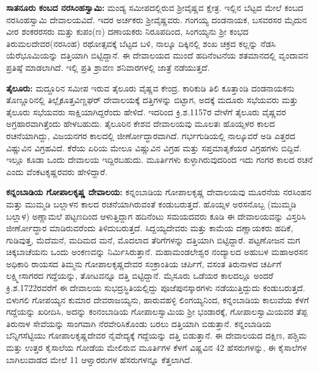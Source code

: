 \textbf{ಸಾತನೂರು ಕಂಬದ ನರಸಿಂಹಸ್ವಾಮಿ:} ಮಂಡ್ಯ ಸಮೀಪದಲ್ಲಿರುವ ಶ‍್ರೀವೈಷ್ಣವ ಕ್ಷೇತ್ರ. ಇಲ್ಲಿನ ಬೆಟ್ಟದ ಮೇಲೆ ಕಂಬದ ನರಸಿಂಹಸ್ವಾಮಿ ದೇವಾಲಯವಿದೆ. ಇದರ ಅರ್ಚಕರು ಶ‍್ರೀವೈಷ್ಣವರು. ಗಂಗಯ್ಯ ದಂಡನಾಯಕ, ಬಸವರಸರ ಮೈದುನ ವೀರ ಶಂಕರರಸರು ಮತ್ತು ಕುಪಂ(ಣ) ದಣಾಯಕರು ನಿರೂಪದಿಂದ, ಸಿಂಗಯ್ಯನು ಶ‍್ರೀ ಕಂಭದ ತಿರುಮಲದೇವರ(ನರಸಿಂಹ) ರಥೋತ್ಸವಕ್ಕೆ ಬೆಟ್ಟದ ಬಳಿ, ನಾಲ್ಕೂ ದಿಕ್ಕಿನಲ್ಲಿ ಶಂಖ ಚಕ್ರದ ಕಲ್ಲನ್ನು ನೆಡಸಿ ಯೆರೆಭೂಮಿಯನ್ನು ದತ್ತಿಯಾಗಿ ಬಿಟ್ಟಿದ್ದಾನೆ. ಈ ದೇವಾಲಯದ ಮುಂದೆ ಹದಿನೆಂಟನೆಯ ಶತಮಾನದಲ್ಲಿ ವೃಂದಾವನ ಪ್ರತಿಷ್ಠೆ ಮಾಡಲಾಗಿದೆ. ಇಲ್ಲಿ ಪ್ರತಿ ಶ್ರಾವಣ ಶನಿವಾರಗಳಲ್ಲಿ ಜಾತ್ರೆ ನಡೆಯುತ್ತದೆ.

\textbf{ತೈಲೂರು:} ಮದ್ದೂರಿನ ಸಮೀಪ ಇರುವ ತೈಲೂರು ವೈಷ್ಣವ ಕೇಂದ್ರ. ಕಾರಿಕುಡಿ ತಿಲಿ ಕೂತ್ತಾಂಡಿ ದಂಡನಾಯಕನು ತೊಣ್ಣೂರಿನಲ್ಲಿ ತಿಲ್ಲೈಕೂತ್ತವಿಣ್ಣಘರ್​ ದೇವಾಲಯಕ್ಕೆ ದತ್ತಿಗಳನ್ನು ಬಿಟ್ಟಾಗ, ಅದಕ್ಕೆ ಮದೂರು ಸಭೆಯವರು ಮತ್ತು ತೈಲೂರು ಸಭೆಯವರು ಸಾಕ್ಷಿಯಾಗಿದ್ದರೆಂದು ಹೇಳಿದೆ. ಇದರಿಂದ ಕ್ರಿ.ಶ.1157ರ ವೇಳೆಗೆ ತೈಲೂರು ವೈಷ್ಣವರ ಅಗ್ರಹಾರವಾಗಿತ್ತೆಂದು ಹೇಳಬಹುದು. ತೈಲೂರಿನ ಕೇಶವ ದೇವಾಲಯವು ಮೂಲತಃ ಹೊಯ್ಸಳರ ಕಾಲದ ರಚನೆಯಾಗಿದ್ದು, ವಿಜಯನಗರ ಕಾಲದಲ್ಲಿ ಜೀರ್ಣೋದ್ಧಾರವಾಗಿದೆ. ಗರ್ಭಗುಡಿಯಲ್ಲಿ ನಾಲ್ಕೂವರೆ ಅಡಿ ಎತ್ತರದ ವಿಷ್ಣುವಿನ ವಿಗ್ರಹವಿದೆ. ಕೆರೆಯ ಏರಿಯ ಮೇಲೂ ವಿಷ್ಣುವಿನ ವಿಗ್ರಹ ಮತ್ತು ಸಪ್ತಮಾತೃಕೆಯರ ವಿಗ್ರಹಗಳು ಬಿದ್ದಿವೆ. ಇಲ್ಲೂ ಕೂಡಾ ಒಂದು ದೇವಾಲಯ ಇದ್ದಿರಬಹುದು. ಮೂರ್ತಿಗಳು ಕುಳ್ಳಾಗಿರುವುದರಿಂದ ಇದು ಗಂಗರ ಕಾಲದ ರಚನೆ ಎಂದು ವೆಂಕಟಕೃಷ್ಣರವರು ಹೇಳಿದ್ದಾರೆ.

\textbf{ಕನ್ನಂಬಾಡಿಯ ಗೋಪಾಲಕೃಷ್ಣ ದೇವಾಲಯ: } ಕನ್ನಂಬಾಡಿಯ ಗೋಪಾಲಕೃಷ್ಣ ದೇವಾಲಯವು ಮೂರನೆಯ ನರಸಿಂಹನ ಮತ್ತು ಮುಮ್ಮಡಿ ಬಲ್ಲಾಳನ ಕಾಲದ ರಚನೆಯಾಗಿರುವಂತೆ ಕಂಡುಬರುತ್ತದೆ. ಹೊಯ್ಸಳ ಅರಸನೊಬ್ಬ (ಮುಮ್ಮಡಿ ಬಲ್ಲಾಳ) ಅಣ್ಣಾಮಲೆ ಪಟ್ಟಣದಿಂದ ಆಳುತ್ತಿದ್ದಾಗ ಹದಿನೆಂಟು ಸಮಯದವರು ಕೂಡಿ ಈ ದೇವಾಲಯವನ್ನು ವಿಸ್ತರಿಸಿ ಜೀರ್ಣೋದ್ಧಾರ ಮಾಡಿರುವರೆಂದು ತಿಳಿದುಬರುತ್ತದೆ. ಸಿದ್ದಯ್ಯದೇವರು ಮತ್ತು ಕಾಮೆಯ ದಣ್ಣಾಯಕರು ಹದಿಕೆ, ಗುಡಿವುತ್ತ, ಮೆದೆಮನೆ, ಮದಿಮದ ಮನೆ, ಮೊದಲಾದ ತೆರಿಗೆಗಳನ್ನು ದತ್ತಿಯಾಗಿ ಬಿಟ್ಟಿದ್ದಾರೆ. ಪಟ್ಟಣೋಜನ ಮಗ ಚಿಕ್ಕಬಾಚೆಯನು ಒಂದು ಅಂಕಣವನ್ನು ನಿರ್ಮಿಸಿರುತ್ತಾನೆ. ಮಹಾಮಂಡಲೇಶ್ವರ ನಂದ್ಯಾಲದ ಅಹುಬಳ ಮಹಾಅರಸನ ಅಧಿಕಾರಿ ರಾಯಸದ ತಿಮ್ಮನು ಗೋಪಾಲಕೃಷ್ಣದೇವರ ಸಂಕ್ರಾಂತಿಯ ಚರ್ಪಿಗೆ, ವಸಂತ ತಿರುನಾಳದ ಚರ್ಪಿಗೆ ಲಕ್ಷ್ಮೀಸಾಗರದ ಗದ್ದೆಯನ್ನು, ತೋಟವನ್ನೂ ದತ್ತಿ ಬಿಟ್ಟಿದ್ದಾನೆ. ಮೈಸೂರು ಒಡೆಯರ ಕಾಲದಲ್ಲೂ ಅಂದರೆ ಕ್ರಿ.ಶ.1722ರವರೆಗೆ ಈ ದೇವಾಲಯ ಸುಭದ್ರಸ್ಥಿತಿಯಲ್ಲಿದ್ದು ಪೂಜೆಪುನಸ್ಕಾರಗಳು ನಡೆಯುತ್ತಿದ್ದುದು ಕಂಡುಬರುತ್ತದೆ. ಬಿಳುಗಲಿ ಗೋಪಯ್ಯನ ಕುಮಾರ ದೇವರಾಜಯ್ಯನು, ಹಾರುವಹಳ್ಳಿ ಲಿಂಗಯ್ಯನಿಂದ, ಕನ್ನಂಬಾಡಿಯ ಕಾಲುವೆಯ ಕೆಳಗೆ ಗದ್ದೆಯನ್ನು ಖರೀದಿಸಿ, ಅದನ್ನು ಕಂನಂಬಾಡಿಯ ಗೋಪಾಲಸ್ವಾಮಿಯ ಶ‍್ರೀ ಭಂಡಾರಕ್ಕೆ, ಗೋಪಾಲಸ್ವಾಮಿಯವರ ತೆಪ್ಪ ತಿರುನಾಳ ಸೇವೆಯನ್ನು ಸಾಂಗವಾಗಿ ನೆರವೇರಿಸಿಕೊಂಡು ಬರಲು ದತ್ತಿಯಾಗಿ ಬಿಡುತ್ತಾನೆ. ಕನ್ನಂಬಾಡಿಯ ಬೆನ್ನಿಗಸೆಟ್ಟಿಯು ಗೋಪಾಲಕೃಷ್ಣದೇವರ ನೈವೇದ್ಯಕ್ಕೆ ಗದ್ದೆಯನ್ನು ದತ್ತಿ ಬಿಡುತ್ತಾನೆ. ಈ ದೇವಾಲಯದ ದಕ್ಷಿಣ, ಪಶ್ಚಿಮ ಮತ್ತು ಉತ್ತರ ಕೈಸಾಲೆಯ ಗೋಡೆಯ ಮೇಲಿರುವ ಮೂರ್ತಿಗಳ ಕೆಳಗೆ ವಿಷ್ಣವಿನ 42 ಹೆಸರುಗಳನ್ನು, ಈ ಕೈಸಾಲೆಗಳ ಬಾಗಿಲುವಾಡದ ಮೇಲೆ 11 ಆಳ್ವಾರರುಗಳ ಹೆಸರುಗಳನ್ನೂ ಕೆತ್ತಲಾಗಿದೆ.


